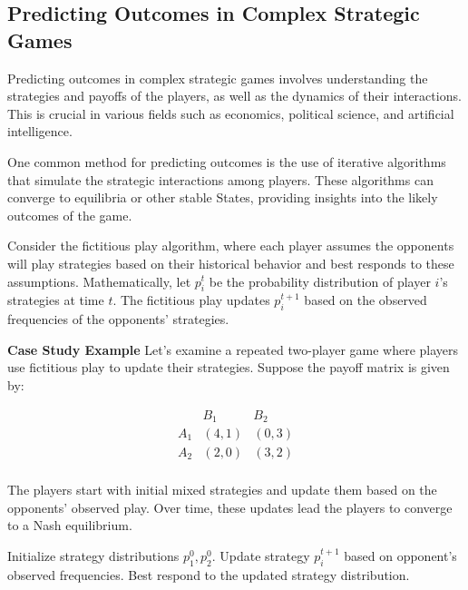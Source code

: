 \documentclass[12pt]{book} %
\begin{document}
\subsection{Predicting Outcomes in Complex Strategic Games}
Predicting outcomes in complex strategic games involves understanding the strategies and payoffs of the players, as well as the dynamics of their interactions. This is crucial in various fields such as economics, political science, and artificial intelligence.

One common method for predicting outcomes is the use of iterative algorithms that simulate the strategic interactions among players. These algorithms can converge to equilibria or other stable States, providing insights into the likely outcomes of the game.

Consider the fictitious play algorithm, where each player assumes the opponents will play strategies based on their historical behavior and best responds to these assumptions. Mathematically, let $p_i^t$ be the probability distribution of player $i$'s strategies at time $t$. The fictitious play updates $p_i^{t+1}$ based on the observed frequencies of the opponents' strategies.

\textbf{Case Study Example}
Let's examine a repeated two-player game where players use fictitious play to update their strategies. Suppose the payoff matrix is given by:

\[
\begin{array}{c|cc}
 & B_1 & B_2 \\
\hline
A_1 & (4, 1) & (0, 3) \\
A_2 & (2, 0) & (3, 2) \\
\end{array}
\]

The players start with initial mixed strategies and update them based on the opponents' observed play. Over time, these updates lead the players to converge to a Nash equilibrium.
\FloatBarrier
\begin{algorithm}[H]
\caption{Fictitious Play Algorithm}
\begin{algorithmic}[1]
\State Initialize strategy distributions $p_1^0, p_2^0$.
        \State Update strategy $p_i^{t+1}$ based on opponent's observed frequencies.
        \State Best respond to the updated strategy distribution.
    \EndFor
\EndFor
\end{algorithmic}
\end{algorithm}
\FloatBarrier
\end{document}
